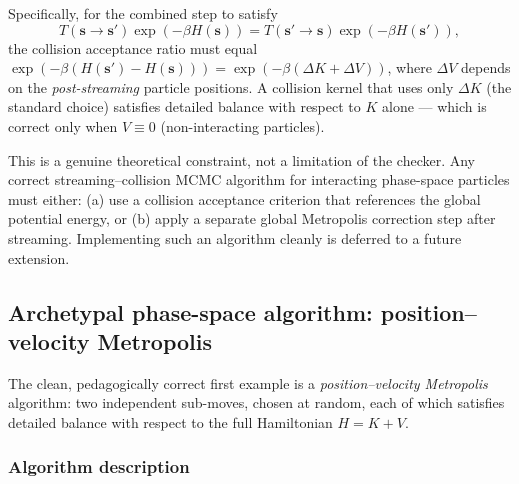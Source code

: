 \documentclass[12pt,a4paper]{article}
\begin{document}
Specifically, for the combined step to satisfy
\[
  T(\mathbf{s} \to \mathbf{s}')
  \exp(-\beta H(\mathbf{s})) =
  T(\mathbf{s}' \to \mathbf{s})
  \exp(-\beta H(\mathbf{s}')),
\]
the collision acceptance ratio must equal
$\exp(-\beta(H(\mathbf{s}') - H(\mathbf{s}))) = \exp(-\beta(\Delta K +
\Delta V))$, where $\Delta V$ depends on the \emph{post-streaming} particle
positions.  A collision kernel that uses only $\Delta K$ (the standard choice)
satisfies detailed balance with respect to $K$ alone --- which is correct only
when $V \equiv 0$ (non-interacting particles).

This is a genuine theoretical constraint, not a limitation of the checker.  Any
correct streaming--collision MCMC algorithm for interacting phase-space
particles must either: (a) use a collision acceptance criterion that references
the global potential energy, or (b) apply a separate global Metropolis
correction step after streaming.  Implementing such an algorithm cleanly is
deferred to a future extension.

\subsection{Archetypal phase-space algorithm: position--velocity Metropolis}
\label{sec:pvmetropolis}

The clean, pedagogically correct first example is a \emph{position--velocity
Metropolis} algorithm: two independent sub-moves, chosen at random, each of
which satisfies detailed balance with respect to the full Hamiltonian $H = K +
V$.

\subsubsection*{Algorithm description}
\end{document}
